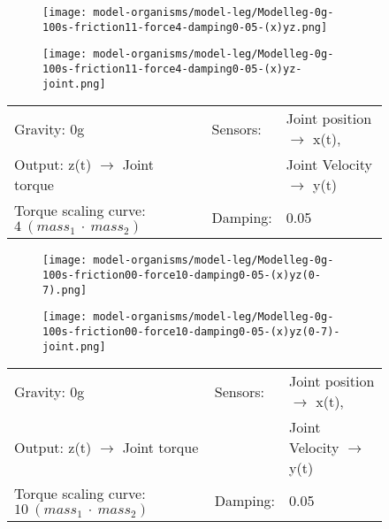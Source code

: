 \documentclass[main]{subfiles}
\begin{document}
\begin{figure}[H]
	\centering
		\begin{subfigure}[c]{0.45\textwidth}
	\texttt{[image: model-organisms/model-leg/Modelleg-0g-100s-friction11-force4-damping0-05-(x)yz.png]}
		\end{subfigure}
	\begin{subfigure}[c]{0.45\textwidth}
	\texttt{[image: model-organisms/model-leg/Modelleg-0g-100s-friction11-force4-damping0-05-(x)yz-joint.png]}
		\end{subfigure}
	\caption[Limited chaotic controller controlling model leg]{}
	\begin{tabular}{l|ll}
	\hline 
	Gravity: 0g  & Sensors: & Joint position \(\rightarrow\) x(t),\\
	 Output: z(t) \(\rightarrow\) Joint torque &  & Joint Velocity \(\rightarrow\) y(t) \\
	  Torque scaling curve: \(4~(mass_1~\cdot~mass_2)\) & Damping: & 0.05 \\
	  \hline
	\end{tabular}

	\label{figure:limited-damped-model-leg-damping2}
\end{figure}

\begin{figure}[H]
	\centering
		\begin{subfigure}[c]{0.45\textwidth}
	\texttt{[image: model-organisms/model-leg/Modelleg-0g-100s-friction00-force10-damping0-05-(x)yz(0-7).png]}
		\end{subfigure}
	\begin{subfigure}[c]{0.45\textwidth}
	\texttt{[image: model-organisms/model-leg/Modelleg-0g-100s-friction00-force10-damping0-05-(x)yz(0-7)-joint.png]}
		\end{subfigure}
	\caption[Limited chaotic controller controlling model leg]{}
	\begin{tabular}{l|ll}
	\hline 
	Gravity: 0g  & Sensors: & Joint position \(\rightarrow\) x(t),\\
	 Output: z(t) \(\rightarrow\) Joint torque &  & Joint Velocity \(\rightarrow\) y(t) \\
	  Torque scaling curve: \(10~(mass_1~\cdot~mass_2)\) & Damping: & 0.05 \\
	  \hline
	\end{tabular}

	\label{figure:limited-damped-model-leg6-damping3}
\end{figure}
\end{document}
